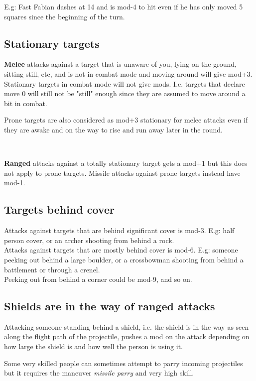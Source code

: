 E.g: Fast Fabian dashes at 14 and is mod-4 to hit even if he has only moved 5 squares since the beginning of the turn.


\subsection*{Stationary targets}
\textbf{Melee} attacks against a target that is unaware of you, lying on the ground, sitting still, etc, and is not in combat mode and moving around will give mod+3. Stationary targets in combat mode will not give mods. I.e. targets that declare move 0 will still not be "still" enough since they are assumed to move around a bit in combat.

Prone targets are also considered as mod+3 stationary for melee attacks even if they are awake and on the way to rise and run away later in the round.

\

\noindent \textbf{Ranged} attacks against a totally stationary target gets a mod+1 but this does not apply to prone targets. Missile attacks against prone targets instead have mod-1.


\subsection*{Targets behind cover}
Attacks against targets that are behind significant cover is mod-3. E.g: half person cover, or an archer shooting from behind a rock. \\
Attacks against targets that are mostly behind cover is mod-6. E.g: someone peeking out behind a large boulder, or a crossbowman shooting from behind a battlement or through a crenel.\\
Peeking out from behind a corner could be mod-9, and so on.


\subsection*{Shields are in the way of ranged attacks}
Attacking someone standing behind a shield, i.e. the shield is in the way as seen along the flight path of the projectile, pushes a mod on the attack depending on how large the shield is and how well the person is using it.

Some very skilled people can sometimes attempt to parry incoming projectiles but it requires the maneuver \emph{missile parry} and very high skill.


